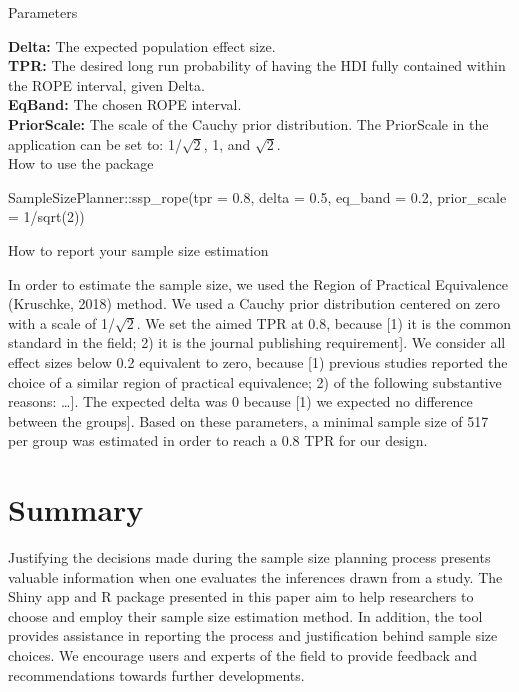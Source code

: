 \documentclass[
  english,
  man,floatsintext]{apa6}
\newenvironment{Shaded}{\begin{snugshade}}{\end{snugshade}}
\newcommand{\AttributeTok}[1]{\textcolor[rgb]{0.77,0.63,0.00}{#1}}
\newcommand{\DecValTok}[1]{\textcolor[rgb]{0.00,0.00,0.81}{#1}}
\newcommand{\FloatTok}[1]{\textcolor[rgb]{0.00,0.00,0.81}{#1}}
\newcommand{\FunctionTok}[1]{\textcolor[rgb]{0.00,0.00,0.00}{#1}}
\newcommand{\NormalTok}[1]{#1}
\newcommand{\SpecialCharTok}[1]{\textcolor[rgb]{0.00,0.00,0.00}{#1}}
\begin{document}
Parameters

\textbf{Delta:} The expected population effect size.\\
\textbf{TPR:} The desired long run probability of having the HDI fully contained within the ROPE interval, given Delta.\\
\textbf{EqBand:} The chosen ROPE interval.\\
\textbf{PriorScale:} The scale of the Cauchy prior distribution. The PriorScale in the application can be set to: 1/\(\sqrt{2}\), 1, and \(\sqrt{2}\).\\

How to use the package

\begin{Shaded}
\begin{Highlighting}[]
\NormalTok{SampleSizePlanner}\SpecialCharTok{::}\FunctionTok{ssp\_rope}\NormalTok{(}\AttributeTok{tpr =} \FloatTok{0.8}\NormalTok{, }\AttributeTok{delta =} \FloatTok{0.5}\NormalTok{, }\AttributeTok{eq\_band =} \FloatTok{0.2}\NormalTok{,}
    \AttributeTok{prior\_scale =} \DecValTok{1}\SpecialCharTok{/}\FunctionTok{sqrt}\NormalTok{(}\DecValTok{2}\NormalTok{))}
\end{Highlighting}
\end{Shaded}

How to report your sample size estimation

In order to estimate the sample size, we used the Region of Practical Equivalence (Kruschke, 2018) method. We used a Cauchy prior distribution centered on zero with a scale of 1/\(\sqrt{2}\). We set the aimed TPR at 0.8, because {[}1) it is the common standard in the field; 2) it is the journal publishing requirement{]}. We consider all effect sizes below 0.2 equivalent to zero, because {[}1) previous studies reported the choice of a similar region of practical equivalence; 2) of the following substantive reasons: \ldots{]}. The expected delta was 0 because {[}1) we expected no difference between the groups{]}. Based on these parameters, a minimal sample size of 517 per group was estimated in order to reach a 0.8 TPR for our design.

\hypertarget{summary}{%
\section{Summary}\label{summary}}

Justifying the decisions made during the sample size planning process presents valuable information when one evaluates the inferences drawn from a study. The Shiny app and R package presented in this paper aim to help researchers to choose and employ their sample size estimation method. In addition, the tool provides assistance in reporting the process and justification behind sample size choices. We encourage users and experts of the field to provide feedback and recommendations towards further developments.
\end{document}
